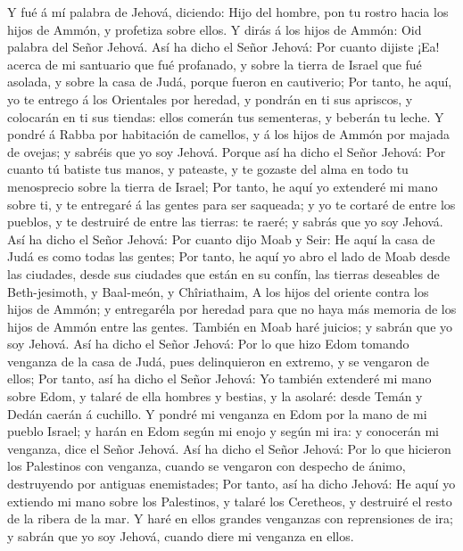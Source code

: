  Y fué á mí palabra de Jehová, diciendo: 
Hijo del hombre, pon tu rostro hacia los hijos de Ammón, y profetiza
sobre ellos.  Y dirás á los hijos de Ammón: Oid palabra
del Señor Jehová. Así ha dicho el Señor Jehová: Por cuanto dijiste ¡Ea!
acerca de mi santuario que fué profanado, y sobre la tierra de Israel
que fué asolada, y sobre la casa de Judá, porque fueron en cautiverio;
 Por tanto, he aquí, yo te entrego á los Orientales por
heredad, y pondrán en ti sus apriscos, y colocarán en ti sus tiendas:
ellos comerán tus sementeras, y beberán tu leche.  Y
pondré á Rabba por habitación de camellos, y á los hijos de Ammón por
majada de ovejas; y sabréis que yo soy Jehová.  Porque así
ha dicho el Señor Jehová: Por cuanto tú batiste tus manos, y pateaste, y
te gozaste del alma en todo tu menosprecio sobre la tierra de Israel;
 Por tanto, he aquí yo extenderé mi mano sobre ti, y te
entregaré á las gentes para ser saqueada; y yo te cortaré de entre los
pueblos, y te destruiré de entre las tierras: te raeré; y sabrás que yo
soy Jehová.  Así ha dicho el Señor Jehová: Por cuanto dijo
Moab y Seir: He aquí la casa de Judá es como todas las gentes;
 Por tanto, he aquí yo abro el lado de Moab desde las
ciudades, desde sus ciudades que están en su confín, las tierras
deseables de Beth-jesimoth, y Baal-meón, y Chîriathaim, 
A los hijos del oriente contra los hijos de Ammón; y entregaréla por
heredad para que no haya más memoria de los hijos de Ammón entre las
gentes.  También en Moab haré juicios; y sabrán que yo
soy Jehová.  Así ha dicho el Señor Jehová: Por lo que
hizo Edom tomando venganza de la casa de Judá, pues delinquieron en
extremo, y se vengaron de ellos;  Por tanto, así ha dicho
el Señor Jehová: Yo también extenderé mi mano sobre Edom, y talaré de
ella hombres y bestias, y la asolaré: desde Temán y Dedán caerán á
cuchillo.  Y pondré mi venganza en Edom por la mano de mi
pueblo Israel; y harán en Edom según mi enojo y según mi ira: y
conocerán mi venganza, dice el Señor Jehová.  Así ha
dicho el Señor Jehová: Por lo que hicieron los Palestinos con venganza,
cuando se vengaron con despecho de ánimo, destruyendo por antiguas
enemistades;  Por tanto, así ha dicho Jehová: He aquí yo
extiendo mi mano sobre los Palestinos, y talaré los Ceretheos, y
destruiré el resto de la ribera de la mar.  Y haré en
ellos grandes venganzas con reprensiones de ira; y sabrán que yo soy
Jehová, cuando diere mi venganza en ellos.

